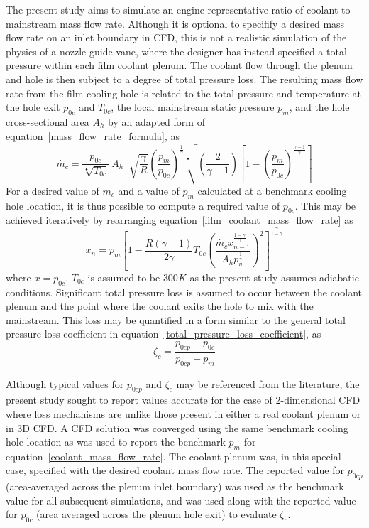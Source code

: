 \documentclass[a4paper, 11pt, oneside]{report}
\begin{document}
The present study aims to simulate an engine-representative ratio of coolant-to-mainstream mass flow rate. Although it is optional to specifify a desired mass flow rate on an inlet boundary in CFD, this is not a realistic simulation of the physics of a nozzle guide vane, where the designer has instead specified a total pressure within each film coolant plenum. The coolant flow through the plenum and hole is then subject to a degree of total pressure loss. The resulting mass flow rate from the film cooling hole is related to the total pressure and temperature at the hole exit $p_{0c}$ and $T_{0c}$, the local mainstream static pressure $p_m$, and the hole cross-sectional area $A_h$ by an adapted form of equation~\ref{mass_flow_rate_formula}, as
\begin{equation}\label{film_coolant_mass_flow_rate}
\dot{m_c} =
\frac{p_{0c}}{\sqrt[•]{T_{0c}}} \>
A_h \;
\sqrt[]{\frac{\gamma}{R}}
\left(
    \frac{p_m}{p_{0c}}
\right)^\frac{1}{\gamma}
\sqrt[•]{
	\left(
		\frac{2}{\gamma - 1}  
	\right)
	\left[
		1 - \left( \frac{p_m}{p_{0c}} \right)^\frac{\gamma-1}{\gamma}
	\right] 
}
\end{equation}
For a desired value of $\dot{m_c}$ and a value of $p_m$ calculated at a benchmark cooling hole location, it is thus possible to compute a required value of $p_{0c}$. This may be achieved iteratively by rearranging equation~\ref{film_coolant_mass_flow_rate} as
\begin{equation}\label{coolant_mass_flow_rate}
x_n =
p_m
\left[
	1-
	\frac{
		R\left(\gamma-1\right)
	}{
		2\gamma
	}
	T_{0c}
	\left(
		\frac{
			\dot{m_c}
			x_{n-1}^{\frac{1-\gamma}{\gamma}}
		}{
			A_h
			p_w^{\frac{1}{\gamma}}
		}
	\right)
	^2
\right]
^{\frac{\gamma}{1-\gamma}}
\end{equation}
where $x=p_{0c}$. $T_{0c}$ is assumed to be $300 K$ as the present study assumes adiabatic conditions. Significant total pressure loss is assumed to occur between the coolant plenum and the point where the coolant exits the hole to mix with the mainstream. This loss may be quantified in a form similar to the general total pressure loss coefficient in equation~\ref{total_pressure_loss_coefficient}, as
\begin{equation}\label{film_coolant_loss_coefficient}
\zeta_c = 
\frac{
p_{0cp} - p_{0c}
}{
p_{0cp} - p_m
}
\end{equation}

Although typical values for $p_{0cp}$ and $\zeta_c$ may be referenced from the literature, the present study sought to report values accurate for the case of 2-dimensional CFD where loss mechanisms are unlike those present in either a real coolant plenum or in 3D CFD. A CFD solution was converged using the same benchmark cooling hole location as was used to report the benchmark $p_m$ for equation~\ref{coolant_mass_flow_rate}. The coolant plenum was, in this special case, specified with the desired coolant mass flow rate. The reported value for $p_{0cp}$ (area-averaged across the plenum inlet boundary) was used as the benchmark value for all subsequent simulations, and was used along with the reported value for $p_{0c}$ (area averaged across the plenum hole exit) to evaluate $\zeta_c$.
\end{document}
